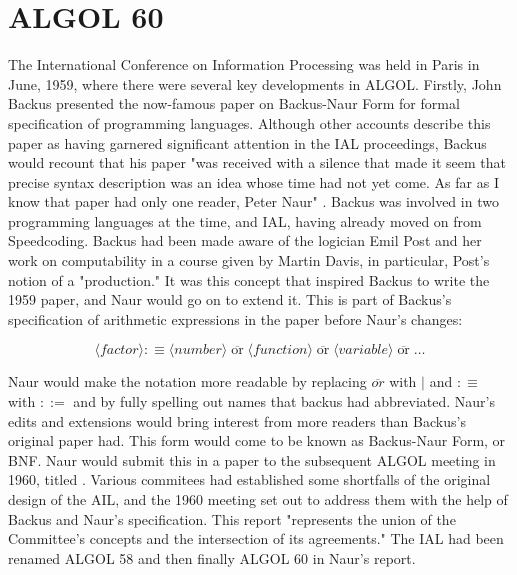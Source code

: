 \section{ALGOL 60}


The International Conference on Information Processing was held in Paris
in June, 1959, where there were several key developments in ALGOL.
Firstly, John Backus presented the now-famous paper on Backus-Naur Form
for formal specification of programming languages\cite{backus_ial_1959}.
Although other accounts describe this paper as having garnered significant
attention in the IAL proceedings, Backus would recount that his paper
"was received with a silence that made it seem that precise syntax
description was an idea whose time had not yet come.
As far as I know that paper had only one reader, Peter Naur"
\cite{Backus_1980_Programming_in_America_in_1950s}.
Backus was involved in two programming languages at the time, \FTN{} and IAL,
having already moved on from Speedcoding.
Backus had been made aware of the logician Emil Post and her work on computability
in a course given by Martin Davis, in particular, Post's notion of a "production."
It was this concept that inspired Backus to write the 1959 paper, and Naur
would go on to extend it. This is part of Backus's specification of arithmetic expressions
in the paper before Naur's changes\cite{backus_ial_1959}:

\[
\langle \textit{factor} \rangle :\equiv
\langle \textit{number} \rangle \;\overline{\text{or}}\;
\langle \textit{function} \rangle \;\overline{\text{or}}\;
\langle \textit{variable} \rangle \;\overline{\text{or}}\;
\dots
\]

Naur would make the notation more readable by replacing $\overbar{or}$ with $|$
and $:\equiv$ with $::=$ and by fully spelling out names that backus had abbreviated.
Naur's edits and extensions would bring interest from more readers than Backus's original paper had.
This form would come to be known as Backus-Naur Form, or BNF.
Naur would submit this in a paper to the subsequent ALGOL meeting in 1960,
titled \cite{naur_backus_algol_1960}.
Various commitees had established some shortfalls of the original design of the AIL,
and the 1960 meeting set out to address them with the help of Backus and Naur's
specification.
This report "represents the union of the Committee's concepts and the
intersection of its agreements."
The IAL had been renamed ALGOL 58 and then finally ALGOL 60 in Naur's report.

